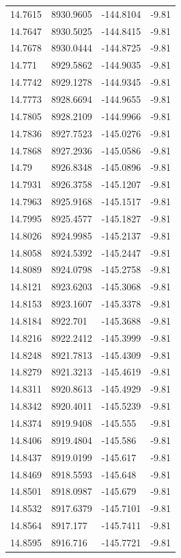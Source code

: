 \begin{table}[H]
\begin{tabular}{llll}
14.7615 & 8930.9605 & -144.8104 & -9.81 \\
14.7647 & 8930.5025 & -144.8415 & -9.81 \\
14.7678 & 8930.0444 & -144.8725 & -9.81 \\
14.771 & 8929.5862 & -144.9035 & -9.81 \\
14.7742 & 8929.1278 & -144.9345 & -9.81 \\
14.7773 & 8928.6694 & -144.9655 & -9.81 \\
14.7805 & 8928.2109 & -144.9966 & -9.81 \\
14.7836 & 8927.7523 & -145.0276 & -9.81 \\
14.7868 & 8927.2936 & -145.0586 & -9.81 \\
14.79 & 8926.8348 & -145.0896 & -9.81 \\
14.7931 & 8926.3758 & -145.1207 & -9.81 \\
14.7963 & 8925.9168 & -145.1517 & -9.81 \\
14.7995 & 8925.4577 & -145.1827 & -9.81 \\
14.8026 & 8924.9985 & -145.2137 & -9.81 \\
14.8058 & 8924.5392 & -145.2447 & -9.81 \\
14.8089 & 8924.0798 & -145.2758 & -9.81 \\
14.8121 & 8923.6203 & -145.3068 & -9.81 \\
14.8153 & 8923.1607 & -145.3378 & -9.81 \\
14.8184 & 8922.701 & -145.3688 & -9.81 \\
14.8216 & 8922.2412 & -145.3999 & -9.81 \\
14.8248 & 8921.7813 & -145.4309 & -9.81 \\
14.8279 & 8921.3213 & -145.4619 & -9.81 \\
14.8311 & 8920.8613 & -145.4929 & -9.81 \\
14.8342 & 8920.4011 & -145.5239 & -9.81 \\
14.8374 & 8919.9408 & -145.555 & -9.81 \\
14.8406 & 8919.4804 & -145.586 & -9.81 \\
14.8437 & 8919.0199 & -145.617 & -9.81 \\
14.8469 & 8918.5593 & -145.648 & -9.81 \\
14.8501 & 8918.0987 & -145.679 & -9.81 \\
14.8532 & 8917.6379 & -145.7101 & -9.81 \\
14.8564 & 8917.177 & -145.7411 & -9.81 \\
14.8595 & 8916.716 & -145.7721 & -9.81 \\

\end{tabular}
\end{table}

